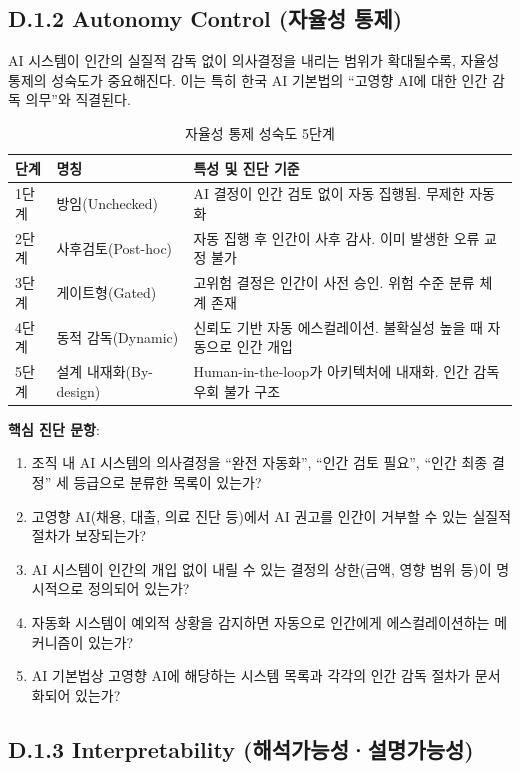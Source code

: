 \subsection*{D.1.2 Autonomy Control (자율성 통제)}

AI 시스템이 인간의 실질적 감독 없이 의사결정을 내리는 범위가 확대될수록, 자율성 통제의 성숙도가 중요해진다. 이는 특히 한국 AI 기본법의 ``고영향 AI에 대한 인간 감독 의무''와 직결된다.

\begin{table}[htbp]
\centering
\caption{자율성 통제 성숙도 5단계}
\label{tab:autonomy_maturity}
\begin{tabularx}{\textwidth}{|l|l|X|}
\hline
\textbf{단계} & \textbf{명칭} & \textbf{특성 및 진단 기준} \\ \hline
1단계 & 방임(Unchecked) & AI 결정이 인간 검토 없이 자동 집행됨. 무제한 자동화 \\ \hline
2단계 & 사후검토(Post-hoc) & 자동 집행 후 인간이 사후 감사. 이미 발생한 오류 교정 불가 \\ \hline
3단계 & 게이트형(Gated) & 고위험 결정은 인간이 사전 승인. 위험 수준 분류 체계 존재 \\ \hline
4단계 & 동적 감독(Dynamic) & 신뢰도 기반 자동 에스컬레이션. 불확실성 높을 때 자동으로 인간 개입 \\ \hline
5단계 & 설계 내재화(By-design) & Human-in-the-loop가 아키텍처에 내재화. 인간 감독 우회 불가 구조 \\ \hline
\end{tabularx}
\end{table}

\textbf{핵심 진단 문항}:
\begin{enumerate}
    \item 조직 내 AI 시스템의 의사결정을 ``완전 자동화'', ``인간 검토 필요'', ``인간 최종 결정'' 세 등급으로 분류한 목록이 있는가?
    \item 고영향 AI(채용, 대출, 의료 진단 등)에서 AI 권고를 인간이 거부할 수 있는 실질적 절차가 보장되는가?
    \item AI 시스템이 인간의 개입 없이 내릴 수 있는 결정의 상한(금액, 영향 범위 등)이 명시적으로 정의되어 있는가?
    \item 자동화 시스템이 예외적 상황을 감지하면 자동으로 인간에게 에스컬레이션하는 메커니즘이 있는가?
    \item AI 기본법상 고영향 AI에 해당하는 시스템 목록과 각각의 인간 감독 절차가 문서화되어 있는가?
\end{enumerate}

\subsection*{D.1.3 Interpretability (해석가능성·설명가능성)}

